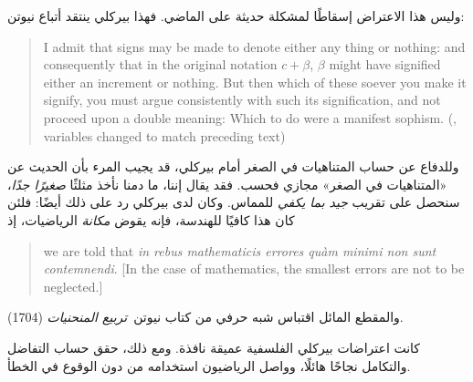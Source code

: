 \documentclass[../../../include/open-logic-section]{subfiles}
\begin{document}
وليس هذا الاعتراض إسقاطًا لمشكلة حديثة على الماضي. فهذا بيركلي ينتقد
أتباع نيوتن:
\begin{quote}
I admit that signs may be made to denote either any thing or nothing:
and consequently that in the original notation $c + \beta$, $\beta$
might have signified either an increment or nothing. But then which of
these soever you make it signify, you must argue consistently with
such its signification, and not proceed upon a double meaning: Which
to do were a manifest sophism. (\citealt[\S{}XIII]{Berkeley1734},
variables changed to match preceding text)
\end{quote}
وللدفاع عن حساب المتناهيات في الصغر أمام بيركلي، قد يجيب المرء بأن
الحديث عن «المتناهيات في الصغر» مجازي فحسب. فقد يقال إننا، ما دمنا
نأخذ مثلثًا \emph{صغيرًا جدًا}، سنحصل على تقريب \emph{جيد بما يكفي}
للمماس. وكان لدى بيركلي رد على ذلك أيضًا: فلئن كان هذا كافيًا
للهندسة، فإنه يقوض \emph{مكانة} الرياضيات، إذ
\begin{quote}
we are told that \emph{in rebus mathematicis errores qu\`{a}m minimi
non sunt contemnendi}. [In the case of mathematics, the smallest
errors are not to be neglected.] \citep[\S{}IX]{Berkeley1734}
\end{quote}
والمقطع المائل اقتباس شبه حرفي من كتاب نيوتن~\emph{تربيع المنحنيات}
(1704).

كانت اعتراضات بيركلي الفلسفية عميقة نافذة. ومع ذلك، حقق حساب التفاضل
والتكامل نجاحًا هائلًا، وواصل الرياضيون استخدامه من دون الوقوع في
الخطأ.
\end{document}
